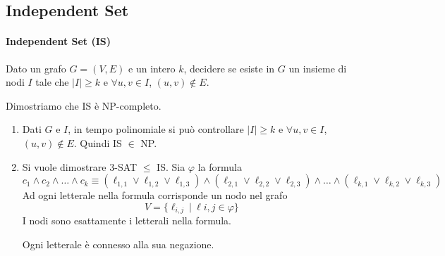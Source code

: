 \subsection{Independent Set}
\paragraph{Independent Set (IS)} Dato un grafo $G=(V,E)$ e un intero $k$, decidere se esiste  in $G$ un insieme di nodi $I$ tale che $|I|\geq k$ e $\forall u,v\in I$, $(u,v)\notin E$.\medskip

Dimostriamo che IS è NP-completo.
\begin{enumerate}
    \item Dati $G$ e $I$, in tempo polinomiale si può controllare $|I|\geq k$ e $\forall u,v\in I$, $(u,v)\notin E$. Quindi IS $\in$ NP.
    \item Si vuole dimostrare 3-SAT $\leq$ IS. Sia $\varphi$ la formula
    $$
        c_1\land c_2\land\dots\land c_k \equiv
        (\ell_{1,1}\lor\ell_{1,2}\lor\ell_{1,3}) \land
        (\ell_{2,1}\lor\ell_{2,2}\lor\ell_{2,3}) \land
        \dots \land
        (\ell_{k,1}\lor\ell_{k,2}\lor\ell_{k,3})
    $$
    Ad ogni letterale nella formula corrisponde un nodo nel grafo
    $$
        V = \{ \ell_{i,j} ~|~ \ell{i,j}\in\varphi \}
    $$
    I nodi sono esattamente i letterali nella formula.
    \begin{center}
    \end{center}
    Ogni letterale è connesso alla sua negazione.
    \begin{center}
\end{center}
\end{enumerate}
